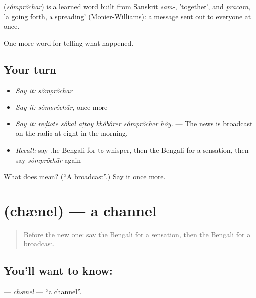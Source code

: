 \begin{cousinweb}
\textbf{} (\emph{sômprôchār}) is a learned word built from Sanskrit \emph{sam-}, 'together', and \emph{pracāra}, 'a going forth, a spreading' (Monier-Williams): a message sent out to everyone at once.
\end{cousinweb}

\begin{grammarlens}[title={What you've built}]
One more word for telling what happened.
\end{grammarlens}

\subsection*{Your turn}
\begin{itemize}
\raggedright
  \item \emph{Say it:} \emph{sômprôchār}
  \item \emph{Say it:} \emph{sômprôchār}, once more
  \item \emph{Say it:} \emph{reḍiote sôkāl āṭṭāy khôbôrer sômprôchār hôy.} — The news is broadcast on the radio at eight in the morning.
  \item \emph{Recall:} say the Bengali for to whisper, then the Bengali for a sensation, then say \emph{sômprôchār} again
\end{itemize}

\begin{tcolorbox}[breakable,colback=teal!4,colframe=teal!35!black,title={Before you move on}]
What does  mean? (\textquotedblleft{}A broadcast\textquotedblright{}.) Say it once more.
\end{tcolorbox}
\section[\texorpdfstring{\bn{চ্যানেল} (chænel)}{চ্যানেল (chænel)}]{ (chænel) — a channel}

\label{lesson:BN-C299-chenel}



\begin{quote}
Before the new one: say the Bengali for a sensation, then the Bengali for a broadcast.
\end{quote}

\subsection*{You'll want to know: }
\textbf{} — \emph{chænel} — \textquotedblleft{}a channel\textquotedblright{}.

